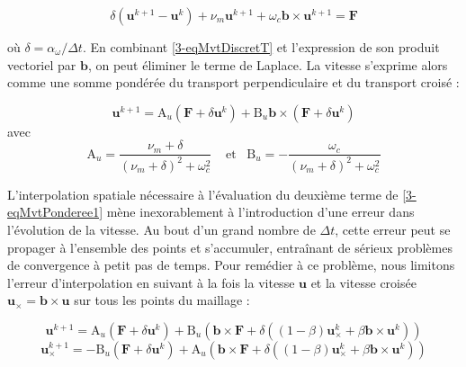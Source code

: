 \begin{refsection}
\begin{equation}
\label{3-eqMvtDiscretT}
\delta\left(\mathbf{u}^{k+1}-\mathbf{u}^{k}\right) + 
\nu_m\mathbf{u}^{k+1}+\omega_{c}\mathbf{b}\times\mathbf{u}^{k+1}=
\mathbf F
\end{equation}

où $\delta=\alpha_\omega/\Delta t$. En combinant \ref{3-eqMvtDiscretT} et
l'expression de son produit vectoriel par $\mathbf b$, on peut éliminer le
terme de Laplace. La vitesse s'exprime alors comme une somme pondérée du
transport perpendiculaire et du transport croisé :

\begin{equation}
\label{3-eqMvtPonderee1}
\mathbf{u}^{k+1}=\text{A}_u\left(\mathbf F + \delta\mathbf{u}^{k}\right)+
\text{B}_u\mathbf b\times\left(\mathbf F + \delta\mathbf{u}^{k}\right)
\end{equation}
avec 
\begin{equation}
\label{3-coefficientsVitesses}
\text{A}_u=\frac{\nu_m+\delta}{(\nu_m+\delta)^2+\omega_c^2}\;\;\;\;\text{et}\;\;\;\text{B}_u=-\frac{\omega_c}{(\nu_m+\delta)^2+\omega_c^2}
\end{equation}

L'interpolation spatiale nécessaire à l'évaluation du
deuxième terme de \eqref{3-eqMvtPonderee1} mène
inexorablement à l'introduction d'une erreur dans l'évolution de la vitesse. Au
bout d'un grand nombre de $\Delta t$, cette erreur peut se propager à
l'ensemble des points et s'accumuler, entraînant de sérieux problèmes de convergence à petit
pas de temps. Pour remédier à ce problème, nous limitons l'erreur
d'interpolation en suivant à la fois la vitesse $\mathbf u$ et la vitesse
croisée $\mathbf u_\times=\mathbf b\times\mathbf u$ sur tous les points du
maillage :

\begin{equation}
\label{3-eqMvtPonderee12}
\mathbf{u}^{k+1}=\text{A}_u\left(\mathbf F + \delta\mathbf{u}^{k}\right)+
\text{B}_u\left(\mathbf b\times\mathbf F +
\delta\left((1-\beta)\mathbf{u}_\times^{k}+\beta\mathbf
b\times\mathbf{u}^{k}\right)\right)
\end{equation}
\begin{equation}
\label{3-eqMvtPonderee2}
\mathbf{u}_\times^{k+1}=-\text{B}_u\left(\mathbf F +
\delta\mathbf{u}^{k}\right)+ \text{A}_u\left(\mathbf
b\times\mathbf F +
\delta\left((1-\beta)\mathbf{u}_\times^{k}+\beta\mathbf
b\times\mathbf{u}^{k}\right)\right)
\end{equation}


\end{refsection}
